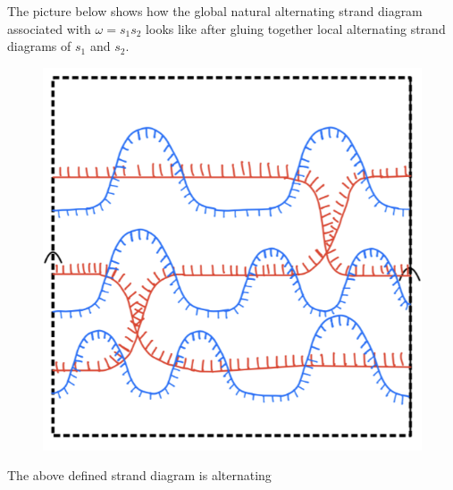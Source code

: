 The picture below shows how the global natural alternating strand diagram associated with $\omega = s_1 s_2$ looks like after gluing together local alternating strand diagrams of $s_1$ and $s_2$.

\begin{figure}[H] 
    \centering
    \includegraphics[scale = 0.55]{diagrams/natural_alternating_diagrams/10.png} 
    \caption{}
    \label{fig:your-label}
\end{figure}

\begin{theorem}
The above defined strand diagram is alternating
\end{theorem}

